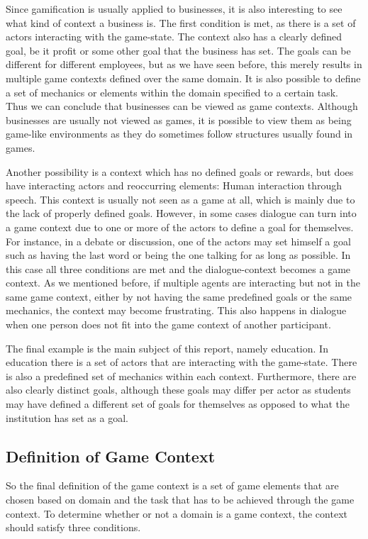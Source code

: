\documentclass[11pt]{article}
\begin{document}
Since gamification is usually applied to businesses, it is also interesting to see what kind of context a business is. The first condition is met, as there is a set of actors interacting with the game-state. The context also has a clearly defined goal, be it profit or some other goal that the business has set. The goals can be different for different employees, but as we have seen before, this merely results in multiple game contexts defined over the same domain. It is also possible to define a set of mechanics or elements within the domain specified to a certain task. Thus we can conclude that businesses can be viewed as game contexts. Although businesses are usually not viewed as games, it is possible to view them as being game-like environments as they do sometimes follow structures usually found in games.

Another possibility is a context which has no defined goals or rewards, but does have interacting actors and reoccurring elements: Human interaction through speech. This context is usually not seen as a game at all, which is mainly due to the lack of properly defined goals. However, in some cases dialogue can turn into a game context due to one or more of the actors to define a goal for themselves. For instance, in a debate or discussion, one of the actors may set himself a goal such as having the last word or being the one talking for as long as possible. In this case all three conditions are met and the dialogue-context becomes a game context. As we mentioned before, if multiple agents are interacting but not in the same game context, either by not having the same predefined goals or the same mechanics, the context may become frustrating. This also happens in dialogue when one person does not fit into the game context of another participant.

The final example is the main subject of this report, namely education. In education there is a set of actors that are interacting with the game-state. There is also a predefined set of mechanics within each context. Furthermore, there are also clearly distinct goals, although these goals may differ per actor as students may have defined a different set of goals for themselves as opposed to what the institution has set as a goal.

\subsection{Definition of Game Context}
So the final definition of the game context is a set of game elements that are chosen based on domain and the task that has to be achieved through the game context. To determine whether or not a domain is a game context, the context should satisfy three conditions.
\end{document}
